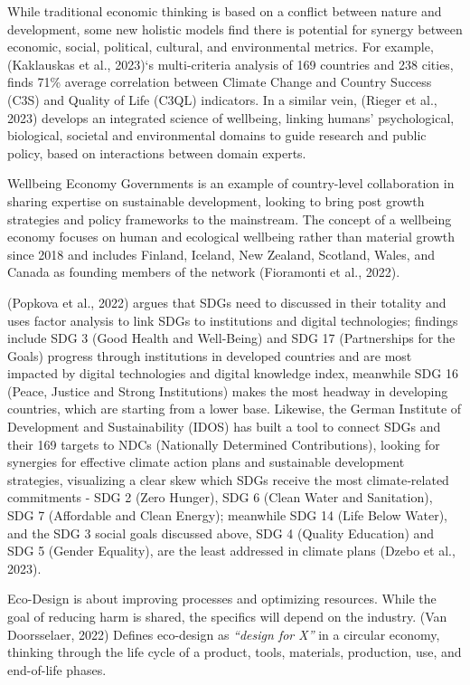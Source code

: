 \documentclass[
  12pt,
  letterpaper,
  DIV=11,
  numbers=noendperiod]{scrartcl}
\begin{document}
While traditional economic thinking is based on a conflict between
nature and development, some new holistic models find there is potential
for synergy between economic, social, political, cultural, and
environmental metrics. For example, (Kaklauskas et al., 2023)`s
multi-criteria analysis of 169 countries and 238 cities, finds 71\%
average correlation between Climate Change and Country Success (C3S) and
Quality of Life (C3QL) indicators. In a similar vein, (Rieger et al.,
2023) develops an integrated science of wellbeing, linking humans'
psychological, biological, societal and environmental domains to guide
research and public policy, based on interactions between domain
experts.

Wellbeing Economy Governments is an example of country-level
collaboration in sharing expertise on sustainable development, looking
to bring post growth strategies and policy frameworks to the mainstream.
The concept of a wellbeing economy focuses on human and ecological
wellbeing rather than material growth since 2018 and includes Finland,
Iceland, New Zealand, Scotland, Wales, and Canada as founding members of
the network (Fioramonti et al., 2022).

(Popkova et al., 2022) argues that SDGs need to discussed in their
totality and uses factor analysis to link SDGs to institutions and
digital technologies; findings include SDG 3 (Good Health and
Well-Being) and SDG 17 (Partnerships for the Goals) progress through
institutions in developed countries and are most impacted by digital
technologies and digital knowledge index, meanwhile SDG 16 (Peace,
Justice and Strong Institutions) makes the most headway in developing
countries, which are starting from a lower base. Likewise, the German
Institute of Development and Sustainability (IDOS) has built a tool to
connect SDGs and their 169 targets to NDCs (Nationally Determined
Contributions), looking for synergies for effective climate action plans
and sustainable development strategies, visualizing a clear skew which
SDGs receive the most climate‐related commitments - SDG 2 (Zero Hunger),
SDG 6 (Clean Water and Sanitation), SDG 7 (Affordable and Clean Energy);
meanwhile SDG 14 (Life Below Water), and the SDG 3 social goals
discussed above, SDG 4 (Quality Education) and SDG 5 (Gender Equality),
are the least addressed in climate plans (Dzebo et al., 2023).

Eco-Design is about improving processes and optimizing resources. While
the goal of reducing harm is shared, the specifics will depend on the
industry. (Van Doorsselaer, 2022) Defines eco-design as \emph{``design
for X''} in a circular economy, thinking through the life cycle of a
product, tools, materials, production, use, and end-of-life phases.
\end{document}
